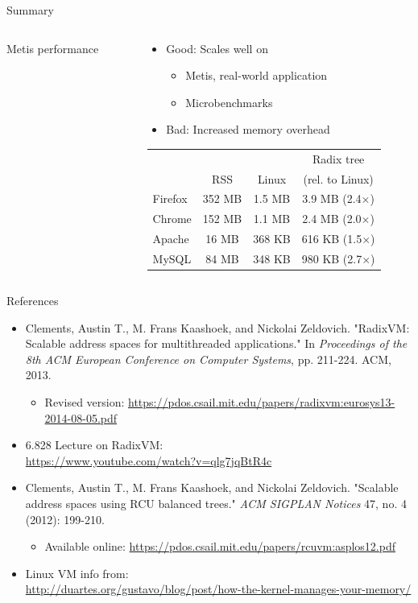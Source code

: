 \documentclass[aspectratio=169]{beamer}
\newcommand{\bi}{\begin{itemize}}
\newcommand{\ei}{\end{itemize}}
\begin{document}
\begin{frame}{Summary}
  \begin{columns}[T]
    \begin{column}{0.5\textwidth}
      \begin{center}
        Metis performance\\
        
      \end{center}
    \end{column}
    \begin{column}{0.5\textwidth}
      \bi
    \item {\color{green}Good}: Scales well on
      \bi
    \item Metis, real-world application
    \item Microbenchmarks
      \ei
    \item {\color{red}Bad}: Increased memory overhead
      \ei
    \begin{tabular}{ l | c | c | c }
              &        &         & Radix tree \\
              & RSS    & Linux   & (rel. to Linux) \\
      \hline
      Firefox & 352 MB & 1.5 MB  & 3.9 MB (2.4$\times$) \\
      Chrome  & 152 MB & 1.1 MB  & 2.4 MB (2.0$\times$) \\
      Apache  & 16 MB  & 368 KB  & 616 KB (1.5$\times$) \\
      MySQL   & 84 MB  & 348 KB  & 980 KB (2.7$\times$) \\
    \end{tabular}
    \end{column}
  \end{columns}
\end{frame}

\begin{frame}[noframenumbering]{References}
  \bi
\item Clements, Austin T., M. Frans Kaashoek, and Nickolai Zeldovich. "RadixVM: Scalable address spaces for multithreaded applications." In \emph{Proceedings of the 8th ACM European Conference on Computer Systems}, pp. 211-224. ACM, 2013.
  \bi
\item Revised version: \url{https://pdos.csail.mit.edu/papers/radixvm:eurosys13-2014-08-05.pdf}
  \ei
\item 6.828 Lecture on RadixVM:\\
  \url{https://www.youtube.com/watch?v=qlg7jqBtR4c}
\item Clements, Austin T., M. Frans Kaashoek, and Nickolai Zeldovich. "Scalable address spaces using RCU balanced trees." \emph{ACM SIGPLAN Notices} 47, no. 4 (2012): 199-210.
  \bi
\item Available online: \url{https://pdos.csail.mit.edu/papers/rcuvm:asplos12.pdf}
  \ei
\item Linux VM info from:\\ \url{http://duartes.org/gustavo/blog/post/how-the-kernel-manages-your-memory/}
  \ei
\end{frame}
\end{document}
